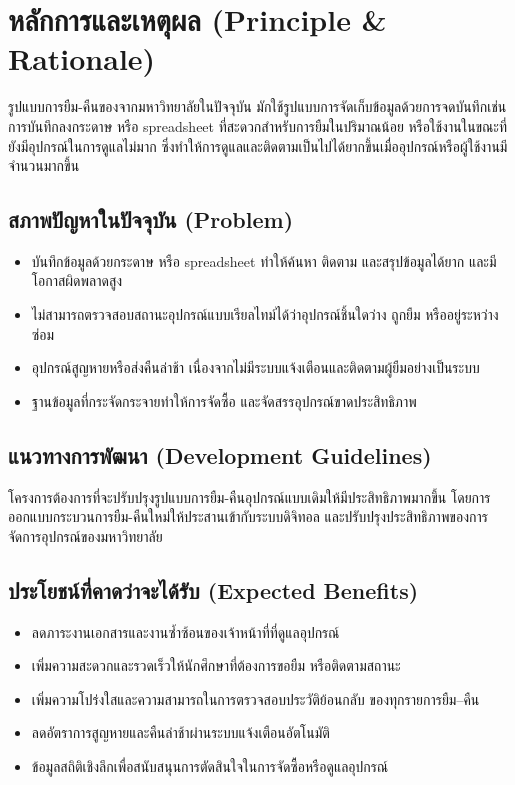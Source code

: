 \section{หลักการและเหตุผล (Principle \& Rationale)}

\hspace*{2em}รูปแบบการยืม-คืนของจากมหาวิทยาลัยในปัจจุบัน มักใช้รูปแบบการจัดเก็บข้อมูลด้วยการจดบันทึกเช่น การบันทึกลงกระดาษ หรือ spreadsheet ที่สะดวกสำหรับการยืมในปริมาณน้อย หรือใช้งานในขณะที่ยังมีอุปกรณ์ในการดูแลไม่มาก ซึ่งทำให้การดูแลและติดตามเป็นไปได้ยากขึ้นเมื่ออุปกรณ์หรือผู้ใช้งานมีจำนวนมากขึ้น

\subsection{สภาพปัญหาในปัจจุบัน (Problem)}

\begin{itemize}
  \item บันทึกข้อมูลด้วยกระดาษ หรือ spreadsheet ทำให้ค้นหา ติดตาม และสรุปข้อมูลได้ยาก และมีโอกาสผิดพลาดสูง
  \item ไม่สามารถตรวจสอบสถานะอุปกรณ์แบบเรียลไทม์ได้ว่าอุปกรณ์ชิ้นใดว่าง ถูกยืม หรืออยู่ระหว่างซ่อม
  \item อุปกรณ์สูญหายหรือส่งคืนล่าช้า เนื่องจากไม่มีระบบแจ้งเตือนและติดตามผู้ยืมอย่างเป็นระบบ
  \item ฐานข้อมูลที่กระจัดกระจายทำให้การจัดซื้อ และจัดสรรอุปกรณ์ขาดประสิทธิภาพ
\end{itemize}

\subsection{แนวทางการพัฒนา (Development Guidelines)}

\hspace*{2em}โครงการต้องการที่จะปรับปรุงรูปแบบการยืม-คืนอุปกรณ์แบบเดิมให้มีประสิทธิภาพมากขึ้น โดยการออกแบบกระบวนการยืม-คืนใหม่ให้ประสานเข้ากับระบบดิจิทอล และปรับปรุงประสิทธิภาพของการจัดการอุปกรณ์ของมหาวิทยาลัย

\subsection{ประโยชน์ที่คาดว่าจะได้รับ (Expected Benefits)}

\begin{itemize}
  \item ลดภาระงานเอกสารและงานซ้ำซ้อนของเจ้าหน้าที่ที่ดูแลอุปกรณ์
  \item เพิ่มความสะดวกและรวดเร็วให้นักศึกษาที่ต้องการขอยืม หรือติดตามสถานะ
  \item เพิ่มความโปร่งใสและความสามารถในการตรวจสอบประวัติย้อนกลับ ของทุกรายการยืม–คืน
  \item ลดอัตราการสูญหายและคืนล่าช้าผ่านระบบแจ้งเตือนอัตโนมัติ
  \item ข้อมูลสถิติเชิงลึกเพื่อสนับสนุนการตัดสินใจในการจัดซื้อหรือดูแลอุปกรณ์
\end{itemize}
